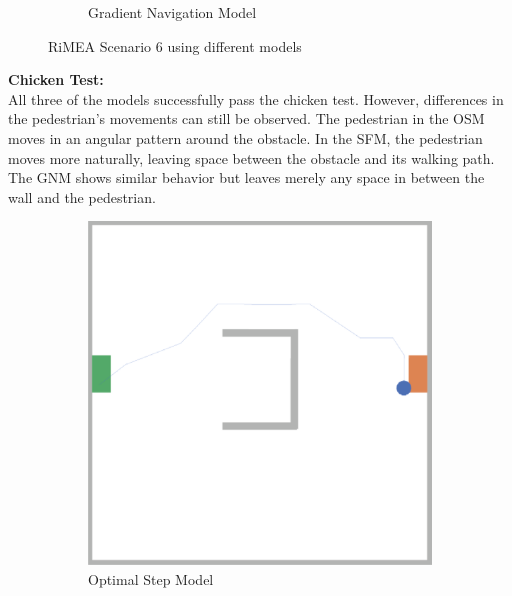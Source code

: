 \begin{figure}[H]
\begin{subfigure}[b]{0.3\textwidth}
     \caption{Gradient Navigation Model}
     \label{fig: rimea6-gnm}
 \end{subfigure}
 \caption{RiMEA Scenario 6 using different models}
 \label{fig: rimea6}
\end{figure}

\textbf{Chicken Test:}\\
All three of the models successfully pass the chicken test. However, differences in the pedestrian's movements can still be observed. The pedestrian in the OSM moves in an angular pattern around the obstacle. In the SFM, the pedestrian moves more naturally, leaving space between the obstacle and its walking path. The GNM shows similar behavior but leaves merely any space in between the wall and the pedestrian. 

\begin{figure}[H]
 \centering
 \begin{subfigure}[b]{0.3\textwidth}
     \centering
     \includegraphics[width=\textwidth]{images/2-osm-chicken.png}
    \caption{Optimal Step Model}
    \label{fig: chicken-osm}
 \end{subfigure}
 \begin{subfigure}[b]{0.3\textwidth}
      \centering

\end{subfigure}
\end{figure}
